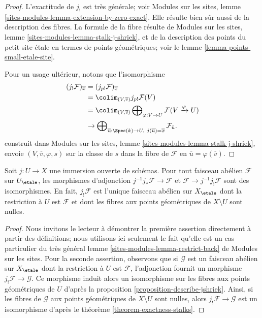 \begin{proof}
L'exactitude de $j_!$ est très générale; voir Modules sur les sites,
lemme \ref{sites-modules-lemma-extension-by-zero-exact}.
Elle résulte bien sûr aussi de la description des fibres.
La formule de la fibre résulte de
Modules sur les sites, lemme \ref{sites-modules-lemma-stalk-j-shriek},
et de la description des points du petit site étale
en termes de points géométriques; voir le lemme \ref{lemma-points-small-etale-site}.

\medskip\noindent
Pour un usage ultérieur, notons que l'isomorphisme
\begin{align*}
(j_!\mathcal{F})_{\overline{x}}
& =
(j_{p!}\mathcal{F})_{\overline{x}} \\
& =
\colim_{(V, \overline{v})} j_{p!}\mathcal{F}(V) \\
& =
\colim_{(V, \overline{v})}
\bigoplus\nolimits_{\varphi : V \to U}
\mathcal{F}(V \xrightarrow{\varphi} U) \\
& \to
\bigoplus\nolimits_{\overline{u} : \Spec(k) \to U,\ j(\overline{u}) =
\overline{x}} \mathcal{F}_{\bar{u}}.
\end{align*}
construit dans Modules sur les sites, lemme \ref{sites-modules-lemma-stalk-j-shriek},
envoie $(V, \overline{v}, \varphi, s)$ sur la classe de $s$ dans la fibre
de $\mathcal{F}$ en $\overline{u} = \varphi(\overline{v})$.
\end{proof}

\begin{lemma}
\label{lemma-jshriek-open}
Soit $j : U \to X$ une immersion ouverte de schémas. Pour tout
faisceau abélien $\mathcal{F}$ sur $U_\etale$, les morphismes d'adjonction
$j^{-1}j_*\mathcal{F} \to \mathcal{F}$ et
$\mathcal{F} \to j^{-1}j_!\mathcal{F}$ sont des isomorphismes.
En fait, $j_!\mathcal{F}$ est l'unique faisceau abélien sur $X_\etale$
dont la restriction à $U$ est $\mathcal{F}$ et dont les fibres aux
points géométriques de $X \setminus U$ sont nulles.
\end{lemma}

\begin{proof}
Nous invitons le lecteur à démontrer la première assertion directement à partir des
définitions; nous utilisons ici seulement le fait qu'elle est un cas particulier du très général
lemme \ref{sites-modules-lemma-restrict-back} de Modules sur les sites.
Pour la seconde assertion, observons que si $\mathcal{G}$ est un faisceau abélien
sur $X_\etale$ dont la restriction à $U$ est $\mathcal{F}$, l'adjonction fournit
un morphisme $j_!\mathcal{F} \to \mathcal{G}$. Ce morphisme
induit alors un isomorphisme sur les fibres aux points géométriques de $U$ d'après la
proposition \ref{proposition-describe-jshriek}.
Ainsi, si les fibres de $\mathcal{G}$ aux points géométriques
de $X \setminus U$ sont nulles, alors $j_!\mathcal{F} \to \mathcal{G}$ est un
isomorphisme d'après le théorème \ref{theorem-exactness-stalks}.
\end{proof}

